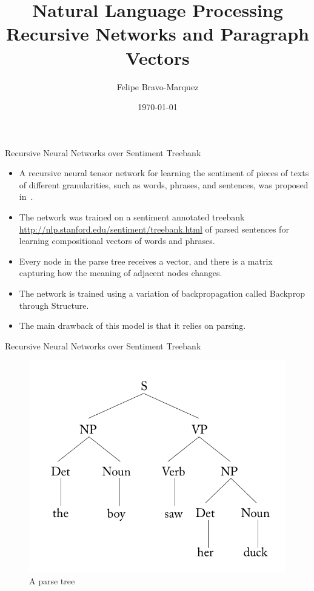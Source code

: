 \documentclass[handout]{beamer}
\title{Natural Language Processing \\ Recursive Networks and Paragraph Vectors}
\author[Felipe Bravo Márquez]{\footnotesize
 \textcolor[rgb]{0.00,0.00,1.00}{Felipe Bravo-Marquez}}
\date{\today}
\begin{document}
\begin{frame}
\titlepage


\end{frame}


\begin{frame}{Recursive Neural Networks over Sentiment Treebank}
\begin{scriptsize}
\begin{itemize}
\item A recursive neural tensor network for learning the sentiment of pieces of texts of different granularities, such as words, phrases, and sentences, was proposed in~\cite{socher2013recursive}.
\item The network was trained on a sentiment annotated treebank \url{http://nlp.stanford.edu/sentiment/treebank.html} of parsed sentences for learning compositional vectors of words and phrases.
\item Every node in the parse tree receives a vector, and there is a matrix capturing how the meaning of adjacent nodes changes. 
\item The network is trained using a variation of backpropagation called Backprop through Structure.
\item The main drawback of this model is that it relies on parsing.
\end{itemize}
\end{scriptsize}
\end{frame}


\begin{frame}{Recursive Neural Networks over Sentiment Treebank}
   
    \begin{figure}[h]
        	\includegraphics[scale = 0.45]{pics/parseTree.png}
        	\caption{A parse tree}
        \end{figure}       
        
\end{frame}
\end{document}
